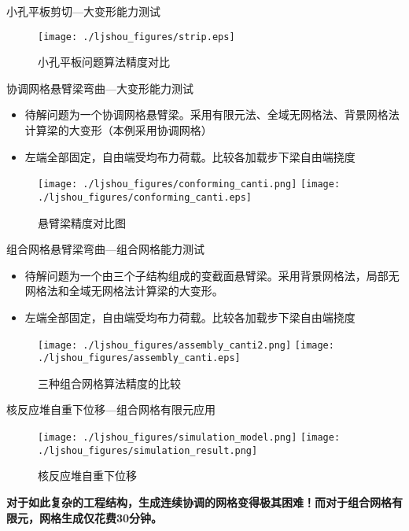 \documentclass[mathserif]{beamer}
\begin{document}
\begin{CJK}{UTF8}{gkai}
\begin{frame}{小孔平板剪切—大变形能力测试}
	\begin{figure}
	\centering
	\texttt{[image: ./ljshou\_figures/strip.eps]}
	\caption{小孔平板问题算法精度对比}
\end{figure}
\end{frame}



\begin{frame}{协调网格悬臂梁弯曲—大变形能力测试}
    \begin{itemize}
    \item 待解问题为一个协调网格悬臂梁。采用有限元法、全域无网格法、背景网格法计算梁的大变形（本例采用协调网格）
    \item 左端全部固定，自由端受均布力荷载。比较各加载步下梁自由端挠度
    \end{itemize}
\begin{figure}
	\centering
	\texttt{[image: ./ljshou\_figures/conforming\_canti.png]}
	\texttt{[image: ./ljshou\_figures/conforming\_canti.eps]}
	\caption{悬臂梁精度对比图}
\end{figure}
\end{frame}



\begin{frame}{组合网格悬臂梁弯曲—组合网格能力测试}
    \begin{itemize}
    \item 待解问题为一个由三个子结构组成的变截面悬臂梁。采用背景网格法，局部无网格法和全域无网格法计算梁的大变形。
    \item 左端全部固定，自由端受均布力荷载。比较各加载步下梁自由端挠度
    \end{itemize}
\begin{figure}
	\centering
	\texttt{[image: ./ljshou\_figures/assembly\_canti2.png]}
	\texttt{[image: ./ljshou\_figures/assembly\_canti.eps]}
	\caption{三种组合网格算法精度的比较}
\end{figure}
\end{frame}



\begin{frame}{核反应堆自重下位移—组合网格有限元应用}
    \begin{figure}
    \centering
    \texttt{[image: ./ljshou\_figures/simulation\_model.png]}
    \texttt{[image: ./ljshou\_figures/simulation\_result.png]}
    \caption{核反应堆自重下位移}
    \end{figure}
\begin{block}{}
	\color{red}\bf 对于如此复杂的工程结构，生成连续协调的网格变得极其困难！而对于组合网格有限元，网格生成仅花费30分钟。
\end{block}
\end{frame}



\end{CJK}
\end{document}
